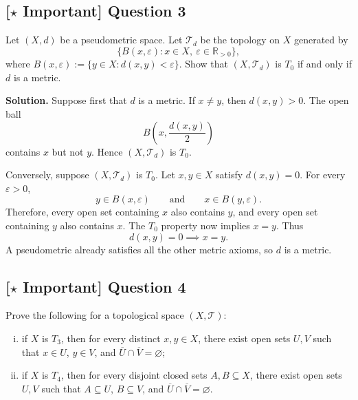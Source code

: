 \documentclass{article}
\newcommand{\R}{\mathbb{R}}
\newcommand{\important}{\texorpdfstring{\textbf{[\(\star\) Important]}}{[Important]}}
\newenvironment{solution}{\par\noindent\textbf{Solution.}\quad}{\par}
\begin{document}
\subsection{\important{} Question 3}

Let $(X,d)$ be a pseudometric space. Let $\mathcal{T}_d$ be the topology on
$X$ generated by
\[
  \{B(x,\varepsilon):x\in X,\ \varepsilon\in\R_{>0}\},
\]
where $B(x,\varepsilon):=\{y\in X:d(x,y)<\varepsilon\}$. Show that
$(X,\mathcal{T}_d)$ is $T_0$ if and only if $d$ is a metric.

\begin{solution}
  Suppose first that $d$ is a metric. If $x\ne y$, then $d(x,y)>0$.
  The open ball
  \[
    B\left(x,\frac{d(x,y)}2\right)
  \]
  contains $x$ but not $y$. Hence $(X,\mathcal{T}_d)$ is $T_0$.

  Conversely, suppose $(X,\mathcal{T}_d)$ is $T_0$. Let $x,y\in X$ satisfy
  $d(x,y)=0$. For every $\varepsilon>0$,
  \[
    y\in B(x,\varepsilon)\qquad\text{and}\qquad
    x\in B(y,\varepsilon).
  \]
  Therefore, every open set containing $x$ also contains $y$, and every
  open set containing $y$ also contains $x$. The $T_0$ property now implies
  $x=y$. Thus
  \[
    d(x,y)=0\implies x=y.
  \]
  A pseudometric already satisfies all the other metric axioms, so $d$ is a
  metric.
\end{solution}

\subsection{\important{} Question 4}

Prove the following for a topological space $(X,\mathcal{T})$:
\begin{enumerate}[(i)]
  \item if $X$ is $T_3$, then for every distinct $x,y\in X$, there exist
    open sets $U,V$ such that $x\in U$, $y\in V$, and
    $\overline{U}\cap\overline{V}=\varnothing$;
  \item if $X$ is $T_4$, then for every disjoint closed sets $A,B\subseteq X$,
    there exist open sets $U,V$ such that $A\subseteq U$, $B\subseteq V$, and
    $\overline{U}\cap\overline{V}=\varnothing$.
\end{enumerate}
\end{document}
